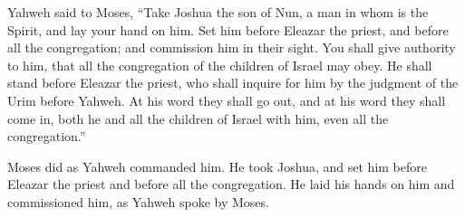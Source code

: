 {\par }{\PP {}Yahweh said to Moses, “Take Joshua the son of Nun, a man in whom is the Spirit, and lay your hand on him.
Set him before Eleazar the priest, and before all the congregation; and commission him in their sight.
You shall give authority to him, that all the congregation of the children of Israel may obey.
He shall stand before Eleazar the priest, who shall inquire for him by the judgment of the Urim before Yahweh. At his word they shall go out, and at his word they shall come in, both he and all the children of Israel with him, even all the congregation.”
\par }{\PP {}Moses did as Yahweh commanded him. He took Joshua, and set him before Eleazar the priest and before all the congregation.
He laid his hands on him and commissioned him, as Yahweh spoke by Moses.

}
